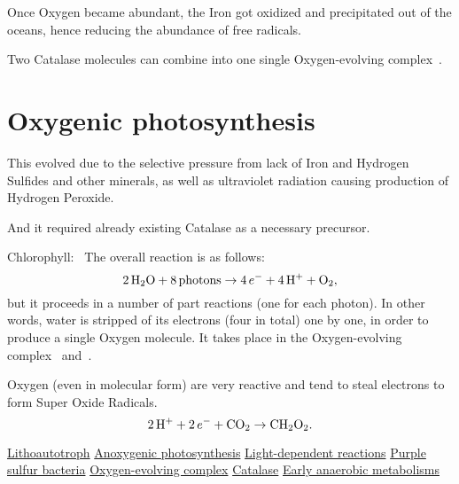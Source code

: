 \documentclass[a4paper,14pt]{extarticle}
\def\H{{\rm H}}
\def\O{{\rm O}}
\def\C{{\rm C}}
\begin{document}
Once Oxygen became abundant, the Iron got oxidized and precipitated out of the oceans, hence reducing the abundance of
free radicals.

Two Catalase molecules can combine into one single Oxygen-evolving complex\ \cite{oxygenevolvingcomplex}.


\section{Oxygenic photosynthesis}
This evolved due to the selective pressure from lack of Iron and Hydrogen Sulfides and other minerals,
as well as ultraviolet radiation causing production of Hydrogen Peroxide.

And it required already existing Catalase as a necessary precursor.

Chlorophyll:\ \cite{lightdependentreactions}
The overall reaction is as follows:
\[
    2\,\H_2\O + 8 \, \text{photons} \rightarrow 4\,e^- + 4\,\H^+ + \O_2,
\]
but it proceeds in a number of part reactions (one for each photon).
In other words, water is stripped of its electrons (four in total) one by one, in order to produce a single Oxygen
molecule.
It takes place in the Oxygen-evolving complex\ \cite{oxygenevolvingcomplex} and\ \cite{catalase}.

Oxygen (even in molecular form) are very reactive and tend to steal electrons to form Super Oxide Radicals.
\[
    2\,\H^+ + 2\,e^- + \C\O_2 \rightarrow \C\H_2\O_2.
\]

\begin{thebibliography}{9}
                \href{https://en.wikipedia.org/wiki/Lithoautotroph}{Lithoautotroph}
      \href{https://en.wikipedia.org/wiki/Anoxygenic_photosynthesis}{Anoxygenic photosynthesis}
       \href{https://en.wikipedia.org/wiki/Light-dependent_reactions}{Light-dependent reactions}
          \href{https://en.wikipedia.org/wiki/Purple_sulfur_bacteria}{Purple sulfur bacteria}
         \href{https://en.wikipedia.org/wiki/Oxygen-evolving_complex}{Oxygen-evolving complex}
                      \href{https://en.wikipedia.org/wiki/Catalase}{Catalase}
     \href{https://pmc.ncbi.nlm.nih.gov/articles/PMC1664682/}{Early anaerobic metabolisms}
\end{thebibliography}
\end{document}
